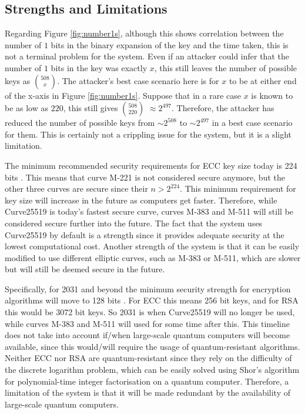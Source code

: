 \documentclass[12pt,a4paper]{article}
\begin{document}
\subsection{Strengths and Limitations} \noindent \label{Strengths}
Regarding Figure \ref{fig:number1s}, although this shows correlation between the number of $1$ bits in the binary expansion of the key 
and the time taken, this is not a terminal problem for the system. 
Even if an attacker could infer that the number of $1$ bits in the key was exactly $x$, 
this still leaves the number of possible keys as $508 \choose x$. 
The attacker's best case scenario here is for $x$ to be at either end of the x-axis in Figure \ref{fig:number1s}. 
Suppose that in a rare case $x$ is known to be as low as $220$, this still gives $508 \choose 220$ $\approx 2^{497}$. 
Therefore, the attacker has reduced the number of possible keys from $\sim 2^{508}$ to $\sim 2^{497}$ in a best case scenario for them. 
This is certainly not a crippling issue for the system, but it is a slight limitation. 

The minimum recommended security requirements for ECC key size today is 224 bits \cite[p54-55]{barker2020recommendation}. 
This means that curve M-221 is not considered secure anymore, but the other three curves are secure since their $n > 2^{224}$. 
This minimum requirement for key size will increase in the future as computers get faster. 
Therefore, while Curve25519 is today's fastest secure curve, 
curves M-383 and M-511 will still be considered secure further into the future. 
The fact that the system uses Curve25519 by default is a strength since it provides adequate security at the lowest computational cost. 
Another strength of the system is that it can be easily modified to use different elliptic curves, such as M-383 or M-511, which are slower but will still be deemed secure in the future. 

Specifically, for 2031 and beyond the minimum security strength for encryption algorithms will move to 128 bits \cite[p59]{barker2020recommendation}. 
For ECC this means 256 bit keys, and for RSA this would be 3072 bit keys. 
So 2031 is when Curve25519 will no longer be used, while curves M-383 and M-511 will used for some time after this. 
This timeline does not take into account if/when large-scale quantum computers will become available, 
since this would/will require the usage of quantum-resistant algorithms. 
Neither ECC nor RSA are quantum-resistant since they rely on the difficulty of the discrete logarithm problem, 
which can be easily solved using Shor's algorithm for polynomial-time integer factorisation on a quantum computer. 
Therefore, a limitation of the system is that it will be made redundant by the availability of large-scale quantum computers. 
\end{document}
